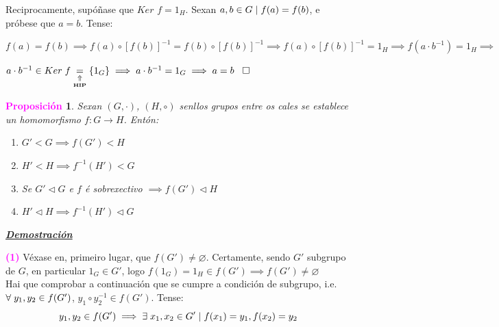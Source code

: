 \documentclass[twoside]{report}
\newcommand{\magbf}[1]{\textcolor{magenta}{\textbf{#1}}} %
\theoremstyle{mystyle}
\newtheorem{prop}{\magbf{Proposición}}[chapter]
\newenvironment{proposition}
{\begin{mdframed}[linecolor = magenta,backgroundcolor = classicrose, linewidth = 2mm]\begin{prop}}
{\end{prop}\end{mdframed}}
\begin{document}
\noindent {} Reciprocamente, supóñase que $Ker$ $f = 1_{H}$.  Sexan $a,b \in G \hspace{1mm} | \hspace{1mm} f(a) = f(b)$, e próbese que $a = b$. Tense:
\begin{center}
$f(a) = f(b) \implies f(a) \circ [f(b)]^{-1} = f(b) \circ [f(b)]^{-1} \implies f(a) \circ [f(b)]^{-1} = 1_{H} \implies f(a \cdot b^{-1}) = 1_{H} \implies$
\end{center}
\begin{center}
$a \cdot b^{-1} \in Ker \hspace{1mm} f \underset{\underset{\textbf{HIP}}{\Uparrow}}{=} \{1_{G}\} \implies a \cdot b^{-1} = 1_{G} \implies a = b \hspace{3mm} \square$
\end{center}

\vspace{3mm}

\begin{proposition} \label{prop1.8}
Sexan $(G, \cdot)$, $(H, \circ)$ senllos grupos entre os cales se establece un homomorfismo $f: G \longrightarrow H$. Entón:
\begin{enumerate}
    \item $G' < G \implies f(G') < H$
    \item $H' < H \implies f^{-1}(H') < G$
    \item Se $G' \triangleleft G$ e $f$ é sobrexectivo $\implies f(G') \triangleleft H$
    \item $H' \triangleleft H \implies f^{-1}(H') \triangleleft G$
\end{enumerate}
\end{proposition}

\vspace{2mm}

\noindent \textbf{\textit{\underline{Demostración}}}

\vspace{2mm}

\noindent \textcolor{magenta}{\textbf{(1)}} Véxase en, primeiro lugar, que $f(G') \neq \varnothing$. Certamente, sendo $G'$ subgrupo de $G$, en particular $1_{G} \in G'$, logo $f(1_{G}) = 1_{H} \in f(G') \implies f(G') \neq \varnothing$ \\

\noindent Hai que comprobar a continuación que se cumpre a condición de subgrupo, i.e. $\forall \hspace{1mm} y_{1},y_{2} \in f(G')$, $y_{1} \circ y_{2}^{-1} \in f(G')$. Tense:
$$y_{1},y_{2} \in f(G') \implies \exists \hspace{1MM} x_{1},x_{2} \in G' \hspace{1MM} | \hspace{1MM} f(x_{1}) = y_{1}, f(x_{2}) = y_{2}$$
\end{document}

